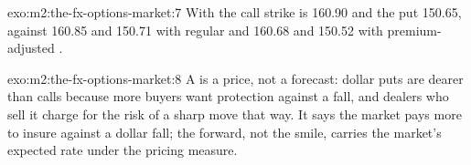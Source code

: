 \begin{solution}{exo:m2:the-fx-options-market:7}
With  the call strike is 160.90 and the put 150.65, against 160.85 and
150.71 with regular  and 160.68 and 150.52 with premium-adjusted .
\end{solution}

\begin{solution}{exo:m2:the-fx-options-market:8}
A  is a price, not a forecast: dollar puts are dearer than calls
because more buyers want protection against a fall, and dealers who sell it
charge for the risk of a sharp move that way. It says the market pays more to
insure against a dollar fall; the forward, not the smile, carries the market's
expected rate under the pricing measure.
\end{solution}

